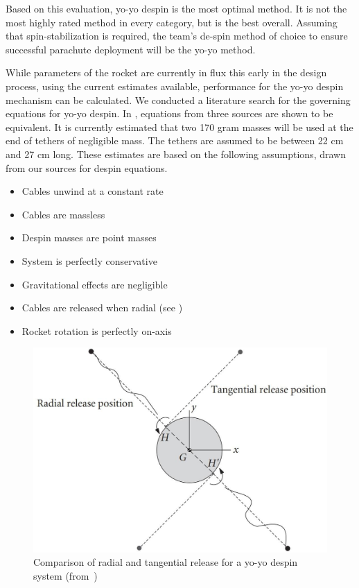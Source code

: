 Based on this evaluation, yo-yo despin is the most optimal method. It is not the most highly rated method in every category, but is the best overall. Assuming that spin-stabilization is required, the team's de-spin method of choice to ensure successful parachute deployment will be the yo-yo method.

While parameters of the rocket are currently in flux this early in the design process, using the current estimates available, performance for the yo-yo despin mechanism can be calculated. We conducted a literature search for the governing equations for yo-yo despin. In , equations from three sources are shown to be equivalent. It is currently estimated that two 170 gram masses will be used at the end of tethers of negligible mass. The tethers are assumed to be between 22 cm and 27 cm long. These estimates are based on the following assumptions, drawn from our sources for despin equations.

\begin{itemize}
    \item Cables unwind at a constant rate
    \item Cables are massless
    \item Despin masses are point masses
    \item System is perfectly conservative
    \item Gravitational effects are negligible
    \item Cables are released when radial (see )
    \item Rocket rotation is perfectly on-axis
\end{itemize}

\begin{figure}
    \centering
    \includegraphics[width=0.75\linewidth]{images/tangential-radial}
    \caption{Comparison of radial and tangential release for a yo-yo despin system (from~\cite{curtis-orbital-mech})}
    \label{figure:tangential-radial}
\end{figure}

